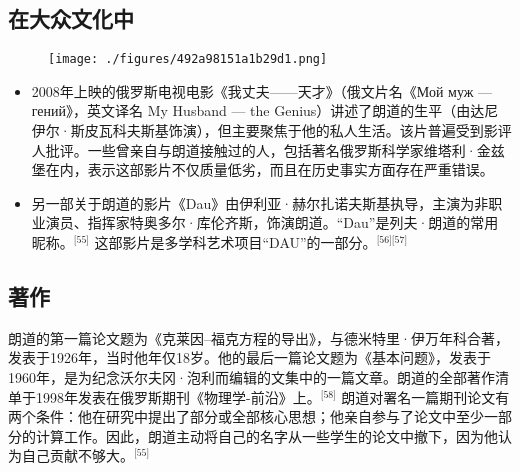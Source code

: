 \subsection{在大众文化中}
\begin{figure}[ht]
\centering
\texttt{[image: ./figures/492a98151a1b29d1.png]}
\caption{} \label{fig_LFLD_7}
\end{figure}
\begin{itemize}
\item 2008年上映的俄罗斯电视电影《我丈夫——天才》（俄文片名《Мой муж — гений》，英文译名 My Husband — the Genius）讲述了朗道的生平（由达尼伊尔·斯皮瓦科夫斯基饰演），但主要聚焦于他的私人生活。该片普遍受到影评人批评。一些曾亲自与朗道接触过的人，包括著名俄罗斯科学家维塔利·金兹堡在内，表示这部影片不仅质量低劣，而且在历史事实方面存在严重错误。
\item 另一部关于朗道的影片《Dau》由伊利亚·赫尔扎诺夫斯基执导，主演为非职业演员、指挥家特奥多尔·库伦齐斯，饰演朗道。“Dau”是列夫·朗道的常用昵称。\(^\text{[55]}\)
这部影片是多学科艺术项目“DAU”的一部分。\(^\text{[56][57]}\)
\end{itemize}
\subsection{著作}
朗道的第一篇论文题为《克莱因–福克方程的导出》，与德米特里·伊万年科合著，发表于1926年，当时他年仅18岁。他的最后一篇论文题为《基本问题》，发表于1960年，是为纪念沃尔夫冈·泡利而编辑的文集中的一篇文章。朗道的全部著作清单于1998年发表在俄罗斯期刊《物理学-前沿》上。\(^\text{[58]}\)
朗道对署名一篇期刊论文有两个条件：他在研究中提出了部分或全部核心思想；他亲自参与了论文中至少一部分的计算工作。因此，朗道主动将自己的名字从一些学生的论文中撤下，因为他认为自己贡献不够大。\(^\text{[55]}\)
